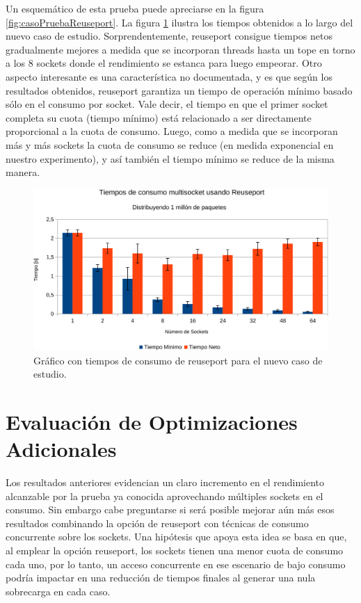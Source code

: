 Un esquemático de esta prueba puede apreciarse en la figura \ref{fig:casoPruebaReuseport}. La figura \ref{fig:resultadosReuseport} ilustra los tiempos obtenidos a lo largo del nuevo caso de estudio. Sorprendentemente, reuseport consigue tiempos netos gradualmente mejores a medida que se incorporan threads hasta un tope en torno a los 8 sockets donde el rendimiento se estanca para luego empeorar. Otro aspecto interesante es una característica no documentada, y es que según los resultados obtenidos, reuseport garantiza un tiempo de operación mínimo basado sólo en el consumo por socket. Vale decir, el tiempo en que el primer socket completa su cuota (tiempo mínimo) está relacionado a ser directamente proporcional a la cuota de consumo. Luego, como a medida que se incorporan más y más sockets la cuota de consumo se reduce (en medida exponencial en nuestro experimento), y así también el tiempo mínimo se reduce de la misma manera.

\begin{figure}[!h]
	\centering
	\includegraphics[scale=.6]{resultados/reuseport1-crop.pdf}
	\caption{Gráfico con tiempos de consumo de reuseport para el nuevo caso de estudio.}
	\label{fig:resultadosReuseport}
\end{figure}

\section{Evaluación de Optimizaciones Adicionales}
Los resultados anteriores evidencian un claro incremento en el rendimiento alcanzable por la prueba ya conocida aprovechando múltiples sockets en el consumo. Sin embargo cabe preguntarse si será posible mejorar aún más esos resultados combinando la opción de reuseport con técnicas de consumo concurrente sobre los sockets. Una hipótesis que apoya esta idea se basa en que, al emplear la opción reuseport, los sockets tienen una menor cuota de consumo cada uno, por lo tanto, un acceso concurrente en ese escenario de bajo consumo podría impactar en una reducción de tiempos finales al generar una nula sobrecarga en cada caso.

